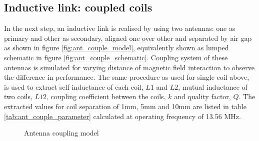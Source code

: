 \documentclass[12pt,a4paper,UKenglish]{article}
\begin{document}
\subsection{Inductive link: coupled coils}

In the next step, an inductive link is realised by using two antennas: one as primary and other as secondary, aligned one over 
other and separated by air gap as shown in figure  \ref{fig:ant_couple_model}, equivalently shown as lumped schematic in 
figure  \ref{fig:ant_couple_schematic}. Coupling system of these antennas is simulated for 
varying distance of magnetic field interaction to observe the difference in performance. The same procedure as 
used for single coil above, is used to extract self inductance of each coil, $L1$ and $L2$, mutual inductance 
of two coils, $L12$, coupling coefficient between the coils, $k$ and quality factor, $Q$. The extracted values for coil separation of 
1mm, 5mm and 10mm are listed in table \ref{tab:ant_couple_parameter} calculated at operating frequency of 13.56 MHz. \\


\begin{figure} [htbp]
  \centering 
\hfill
 \caption{Antenna coupling model} 
\label{fig:ant_couple} 
\end{figure}
\end{document}
